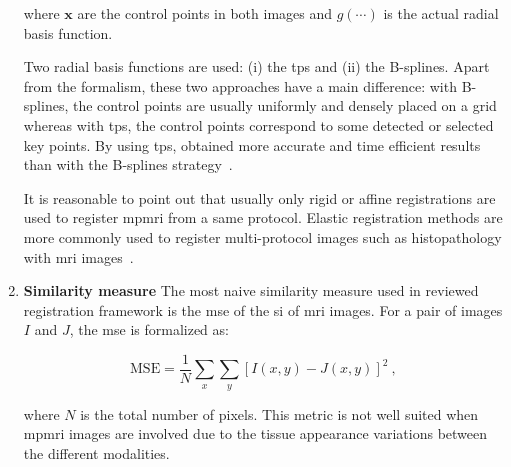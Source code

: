 \begin{enumerate}[leftmargin=*]
\noindent where $\mathbf{x}$ are the control points in both images and
$g(\cdots)$ is the actual radial basis function.

Two radial basis functions are used: (i) the \ac{tps} and (ii) the B-splines.
Apart from the formalism, these two approaches have a main difference: with
B-splines, the control points are usually uniformly and densely placed on a
grid whereas with \ac{tps}, the control points correspond to some detected or
selected key points.
By using \ac{tps}, \citeauthor{Mitra2011} obtained more accurate and time
efficient results than with the B-splines strategy~\cite{Mitra2012a}.

It is reasonable to point out that usually only rigid or affine registrations
are used to register \ac{mpmri} from a same protocol.
Elastic registration methods are more commonly used to register multi-protocol
images such as histopathology with \ac{mri} images~\cite{Toth2008,Toth2009}.

\item[] \textbf{Similarity measure}
The most naive similarity measure used in reviewed registration framework is
the \acf{mse} of the \ac{si} of \ac{mri} images.
For a pair of images $I$ and $J$, the \ac{mse} is formalized as:

\begin{equation}
  \text{MSE} =\frac{1}{N} \sum_x \sum_y \left[ I(x,y) - J(x,y) \right]^2 \ ,
  \label{eq:mse}
\end{equation}

\noindent where $N$ is the total number of pixels.
This metric is not well suited when \ac{mpmri} images are involved due to the
tissue appearance variations between the different modalities.


\end{enumerate}
